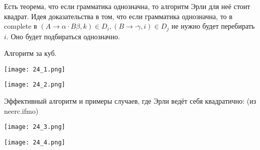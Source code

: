 Есть теорема, что если грамматика однозначна, то алгоритм Эрли для неё стоит квадрат.
Идея доказательства в том, что если грамматика однозначна, то в complete в $(A \rightarrow \alpha \cdot B \beta, k) \in D_i, (B \rightarrow \cdot \gamma, i) \in D_j$ не нужно будет перебирать $i$. Оно будет подбираться однозначно.

Алгоритм за куб.

\texttt{[image: 24\_1.png]}

\texttt{[image: 24\_2.png]}

Эффективный алгоритм и примеры случаев, где Эрли ведёт себя квадратично: (из neerc.ifmo)

\texttt{[image: 24\_3.png]}

\texttt{[image: 24\_4.png]}